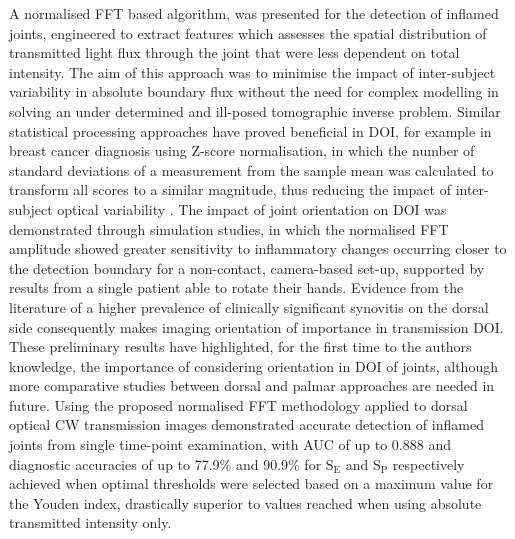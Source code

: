 \documentclass[twoside]{bhamthesis}
\theoremstyle{definition}
\begin{document}
A normalised FFT based algorithm, was presented for the detection of inflamed joints, engineered to extract features which assesses the spatial distribution of transmitted light flux through the joint that were less dependent on total intensity. The aim of this approach was to minimise the impact of inter-subject variability in absolute boundary flux without the need for complex modelling in solving an under determined and ill-posed tomographic inverse problem. Similar statistical processing approaches have proved beneficial in DOI, for example in breast cancer diagnosis using Z-score normalisation, in which the number of standard deviations of a measurement from the sample mean was calculated to transform all scores to a similar magnitude, thus reducing the impact of inter-subject optical variability \cite{cochran2018tissue}. The impact of joint orientation on DOI was demonstrated through simulation studies, in which the normalised FFT amplitude showed greater sensitivity to inflammatory changes occurring closer to the detection boundary for a non-contact, camera-based set-up, supported by results from a single patient able to rotate their hands. Evidence from the literature of a higher prevalence of clinically significant synovitis on the dorsal side consequently makes imaging orientation of importance in transmission DOI. These preliminary results have highlighted, for the first time to the authors knowledge, the importance of considering orientation in DOI of joints, although more comparative studies between dorsal and palmar approaches are needed in future. Using the proposed normalised FFT methodology applied to dorsal optical CW transmission images demonstrated accurate detection of inflamed joints from single time-point examination, with AUC of up to 0.888 and diagnostic accuracies of up to 77.9\% and 90.9\% for $\mathrm{S_E}$ and $\mathrm{S_P}$ respectively achieved when optimal thresholds were selected based on a maximum value for the Youden index, drastically superior to values reached when using absolute transmitted intensity only.
\end{document}
